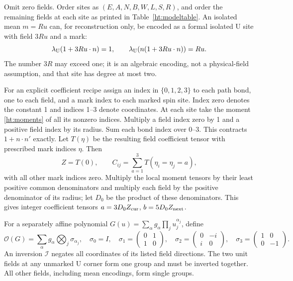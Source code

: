 \begin{htdef}
\label{ht:reconstruct}
Omit zero fields. Order sites as \((E,A,N,B,W,L,S,R)\), and order the
remaining fields at each site as printed in Table~\ref{ht:modeltable}.
An isolated mean \(m=Ru\) can, for reconstruction only, be encoded as
a formal isolated U site with field \(3Ru\) and a mark:
\[
 \lambda_{\mathrm U}(1+3Ru\cdot n)=1,\qquad
 \lambda_{\mathrm U}(n(1+3Ru\cdot n))=Ru.
\]
The number \(3R\) may exceed one; it is an algebraic encoding, not a
physical-field assumption, and that site has degree at most two.

For an explicit coefficient recipe assign an index in \(\{0,1,2,3\}\)
to each path bond, one to each field, and a mark index to each marked
spin site. Index zero denotes the constant 1 and indices 1--3 denote
coordinates. At each site take the moment \eqref{ht:moments} of all
its nonzero indices. Multiply a field index zero by 1 and a positive
field index by its radius. Sum each bond index over 0--3. This contracts
\(1+n\cdot n'\) exactly. Let \(T(\eta)\) be the resulting field
coefficient tensor with prescribed mark indices \(\eta\). Then
\begin{equation}\label{ht:tensorrecipe}
 Z=T(0),\qquad C_{ij}=\sum_{a=1}^3 T(\eta_i=\eta_j=a),
\end{equation}
with all other mark indices zero. Multiply the local moment tensors
by their least positive common denominators and multiply each field
by the positive denominator of its radius; let \(D_0\) be the product
of these denominators. This gives integer coefficient tensors
\(a=3D_0Z_{\rm cur}\), \(b=5D_0Z_{\rm next}\).

For a separately affine polynomial \(G(u)=\sum_\alpha g_\alpha
\prod_j u_j^{\alpha_j}\), define
\[
 \mathcal O(G)=\sum_\alpha g_\alpha\bigotimes_j\sigma_{\alpha_j},
 \quad \sigma_0=I,\quad
 \sigma_1=\begin{pmatrix}0&1\\1&0\end{pmatrix},\quad
 \sigma_2=\begin{pmatrix}0&-i\\i&0\end{pmatrix},\quad
 \sigma_3=\begin{pmatrix}1&0\\0&-1\end{pmatrix}.
\]
An inversion \(\mathcal I\) negates all coordinates of its listed
field directions. The two unit fields at any unmarked U corner form
one group and must be inverted together. All other fields, including
mean encodings, form single groups.


\end{htdef}
